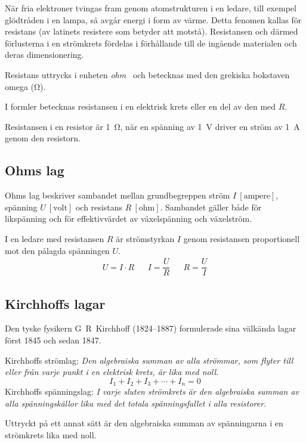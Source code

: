 När fria elektroner tvingas fram genom atomstrukturen i en ledare, till exempel
glödtråden i en lampa, så avgår energi i form av värme.
Detta fenomen kallas för resistans (av latinets resistere som betyder att
motstå).
Resistansen och därmed förlusterna i en strömkrets fördelas i
förhållande till de ingående materialen och deras dimensionering.

Resistans uttrycks i enheten \emph{ohm}~\cite{SIbrochure8} och betecknas med
den grekiska bokstaven omega (\unit{\ohm}).

I formler betecknas resistansen i en elektrisk krets eller en del av den med
\(R\).

Resistansen i en resistor är \qty{1}{\ohm}, när en spänning av \qty{1}{\volt}
driver en ström av \qty{1}{\ampere} genom den resistorn.

\subsection{Ohms lag}
\label{ohms_lag}

Ohms lag beskriver sambandet mellan grundbegreppen ström
\(I\ \mathrm{[ampere]}\), spänning \(U\ \mathrm{[volt]}\) och resistans
\(R\ \mathrm{[ohm]}\).
Sambandet gäller både för likspänning och för effektivvärdet av växelspänning
och växelström.

I en ledare med resistansen \(R\) är strömstyrkan \(I\) genom resistansen
proportionell mot den pålagda spänningen \(U\).
\[
\begin{array}{lllll}U=I \cdot R & & I=\dfrac{U}{R} & & R=\dfrac{U}{I}\end{array}
\]
\subsection{Kirchhoffs lagar}

Den tyske fysikern G~R~Kirchhoff (1824--1887) formulerade sina välkända lagar
först 1845 och sedan 1847.

Kirchhoffs strömlag: \emph{Den algebraiska summan av alla strömmar, som flyter
till eller från varje punkt i en elektrisk krets, är lika med noll.}
\[I_1 + I_2 + I_3 + \cdots + I_n = 0\]
Kirchhoffs spänningslag: \emph{I varje sluten strömkrets är den algebraiska
summan av alla spänningskällor lika med det totala spänningsfallet i alla
resistorer.}

Uttryckt på ett annat sätt är den algebraiska summan av spänningarna i en
strömkrets lika med noll.


